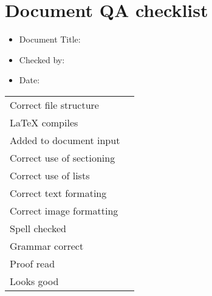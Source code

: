 \documentclass[14pt]{article}
\begin{document}
\section*{Document QA checklist}
\Large
\begin{itemize}
\item Document Title:
\item Checked by:
\item Date:
\end{itemize}
\Large
\begin{tabularx}{\textwidth}{ X | X }
Correct file structure & \\
\LaTeX \hspace{4pt} compiles & \\
Added to document input & \\
Correct use of sectioning & \\
Correct use of lists & \\
Correct text formating & \\
Correct image formatting & \\
Spell checked & \\
Grammar correct & \\
Proof read & \\
Looks good & \\
\end{tabularx}
\end{document}
